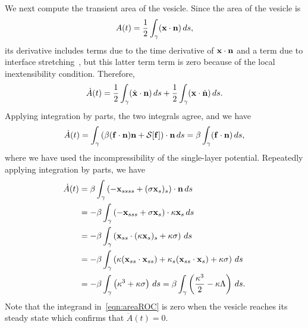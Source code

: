 \documentclass[9pt,twocolumn,twoside,lineno]{pnas-new}
\begin{document}
We next compute the transient area of the vesicle. Since the area of the
vesicle is
\begin{align}
  A(t) = \frac{1}{2}\int_{\gamma} (\mathbf{x} \cdot \mathbf{n})\, ds,
  \label{eqn:area}
\end{align}
its derivative includes terms due to the time derivative of $\mathbf{x} \cdot
\mathbf{n}$ and a term due to interface stretching~\cite{lai-tse-hua2008}, but
this latter term term is zero because of the local inextensibility
condition. Therefore,
\begin{align}
  \dot{A}(t) =
  \frac{1}{2} \int_{\gamma} (\dot{\mathbf{x}} \cdot \mathbf{n})\, ds  + 
  \frac{1}{2} \int_{\gamma} (\mathbf{x} \cdot \dot{\mathbf{n}})\, ds.
\end{align}
Applying integration by parts, the two integrals agree, and we have
\begin{align}
  \dot{A}(t) = \int_\gamma \left(\beta (\mathbf{f} \cdot \mathbf{n})\mathbf{n} 
    + \mathcal{S}[\mathbf{f}]\right) \cdot \mathbf{n}\, ds 
  = \beta \int_\gamma (\mathbf{f} \cdot \mathbf{n})\, ds,
\end{align}
where we have used the incompressibility of the single-layer potential.
Repeatedly applying integration by parts, we have
\begin{align}
  \dot{A}(t) &= \beta \int_\gamma \left( -\mathbf{x}_{ssss} + 
    (\sigma \mathbf{x}_s)_s \right) \cdot \mathbf{n} \, ds \\
  &= -\beta \int_\gamma \left(-\mathbf{x}_{sss} + \sigma \mathbf{x}_s 
    \right) \cdot \kappa \mathbf{x}_s \, ds \\
  &= -\beta \int_\gamma \left(\mathbf{x}_{ss} \cdot 
    (\kappa \mathbf{x}_s)_s + \kappa \sigma \right) \, ds \\
  &= -\beta \int_\gamma \left(\kappa (\mathbf{x}_{ss} \cdot \mathbf{x}_{ss}) + 
    \kappa_s (\mathbf{x}_{ss} \cdot \mathbf{x}_s) + \kappa \sigma \right) 
    \, ds \\
  &= -\beta \int_\gamma \left(\kappa^3 + \kappa \sigma \right) 
    \, ds = \beta \int_\gamma \left(
    \frac{\kappa^3}{2} - \kappa \Lambda \right) \, ds.
  \label{eqn:areaROC}
\end{align}
Note that the integrand in~\eqref{eqn:areaROC} is zero when the vesicle
reaches its steady state which confirms that $\dot{A}(t) = 0$.

\end{document}
